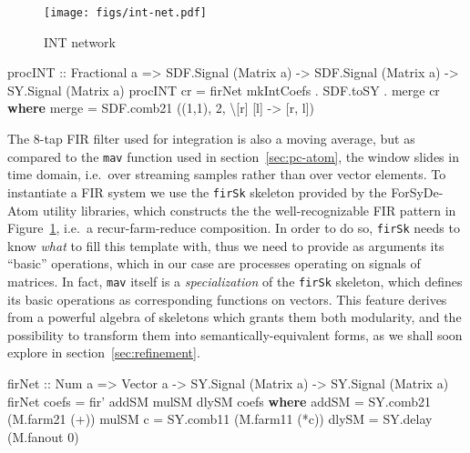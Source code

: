 \documentclass[
  a4paper,
]{article}
\newenvironment{Shaded}{}{}
\newcommand{\DataTypeTok}[1]{\textcolor[rgb]{0.56,0.13,0.00}{#1}}
\newcommand{\DecValTok}[1]{\textcolor[rgb]{0.25,0.63,0.44}{#1}}
\newcommand{\FunctionTok}[1]{\textcolor[rgb]{0.02,0.16,0.49}{#1}}
\newcommand{\KeywordTok}[1]{\textcolor[rgb]{0.00,0.44,0.13}{\textbf{#1}}}
\newcommand{\NormalTok}[1]{#1}
\newcommand{\OtherTok}[1]{\textcolor[rgb]{0.00,0.44,0.13}{#1}}
\begin{document}
\begin{figure}
\hypertarget{fig:int-net-atom}{%
\centering
\texttt{[image: figs/int-net.pdf]}
\caption{INT network}\label{fig:int-net-atom}
}
\end{figure}

\begin{Shaded}
\begin{Highlighting}[numbers=left,,firstnumber=592,]
\OtherTok{procINT ::} \DataTypeTok{Fractional}\NormalTok{ a }\OtherTok{=>} \DataTypeTok{SDF.Signal}\NormalTok{ (}\DataTypeTok{Matrix}\NormalTok{ a) }\OtherTok{->} \DataTypeTok{SDF.Signal}\NormalTok{ (}\DataTypeTok{Matrix}\NormalTok{ a) }\OtherTok{->} \DataTypeTok{SY.Signal}\NormalTok{ (}\DataTypeTok{Matrix}\NormalTok{ a)}
\NormalTok{procINT cr }\FunctionTok{=}\NormalTok{ firNet mkIntCoefs }\FunctionTok{.}\NormalTok{ SDF.toSY }\FunctionTok{.}\NormalTok{ merge cr}
  \KeywordTok{where}
\NormalTok{    merge   }\FunctionTok{=}\NormalTok{ SDF.comb21 ((}\DecValTok{1}\NormalTok{,}\DecValTok{1}\NormalTok{), }\DecValTok{2}\NormalTok{, \textbackslash{}[r] [l] }\OtherTok{->}\NormalTok{ [r, l])}
\end{Highlighting}
\end{Shaded}

The 8-tap FIR filter used for integration is also a moving average, but
as compared to the \texttt{mav} function used in
section~\ref{sec:pc-atom}, the window slides in time domain, i.e.~over
streaming samples rather than over vector elements. To instantiate a FIR
system we use the \texttt{firSk} skeleton provided by the ForSyDe-Atom
utility libraries, which constructs the the well-recognizable FIR
pattern in Figure~\ref{fig:int-net-atom}, i.e.~a recur-farm-reduce
composition. In order to do so, \texttt{firSk} needs to know \emph{what}
to fill this template with, thus we need to provide as arguments its
``basic'' operations, which in our case are processes operating on
signals of matrices. In fact, \texttt{mav} itself is a
\emph{specialization} of the \texttt{firSk} skeleton, which defines its
basic operations as corresponding functions on vectors. This feature
derives from a powerful algebra of skeletons which grants them both
modularity, and the possibility to transform them into
semantically-equivalent forms, as we shall soon explore in
section~\ref{sec:refinement}.

\begin{Shaded}
\begin{Highlighting}[numbers=left,,firstnumber=610,]
\OtherTok{firNet ::} \DataTypeTok{Num}\NormalTok{ a }\OtherTok{=>} \DataTypeTok{Vector}\NormalTok{ a }\OtherTok{->} \DataTypeTok{SY.Signal}\NormalTok{ (}\DataTypeTok{Matrix}\NormalTok{ a) }\OtherTok{->} \DataTypeTok{SY.Signal}\NormalTok{ (}\DataTypeTok{Matrix}\NormalTok{ a)}
\NormalTok{firNet coefs }\FunctionTok{=}\NormalTok{ fir' addSM mulSM dlySM coefs}
  \KeywordTok{where}
\NormalTok{    addSM   }\FunctionTok{=}\NormalTok{ SY.comb21 (M.farm21 (}\FunctionTok{+}\NormalTok{))}
\NormalTok{    mulSM c }\FunctionTok{=}\NormalTok{ SY.comb11 (M.farm11 (}\FunctionTok{*}\NormalTok{c))}
\NormalTok{    dlySM   }\FunctionTok{=}\NormalTok{ SY.delay  (M.fanout }\DecValTok{0}\NormalTok{)}
\end{Highlighting}
\end{Shaded}
\end{document}
